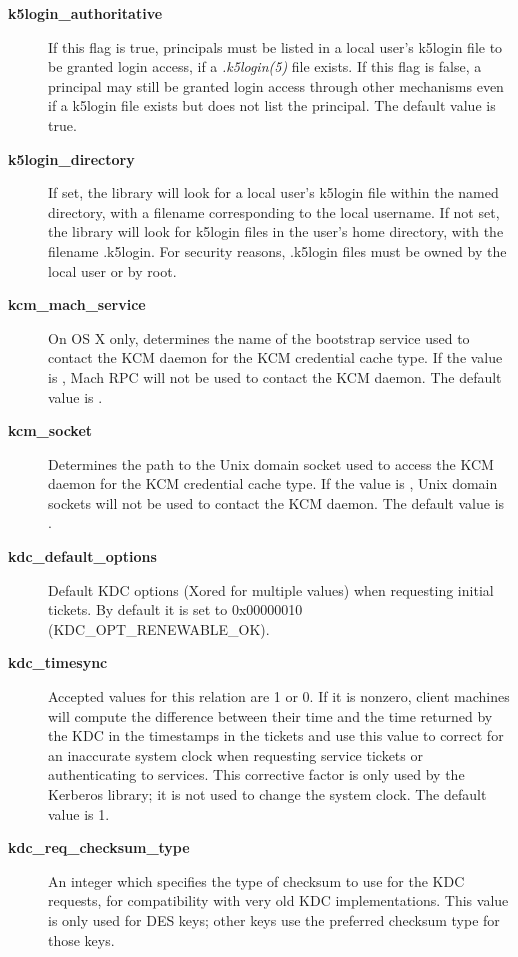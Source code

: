 \documentclass[letterpaper,10pt,english]{sphinxmanual}
\begin{document}
\begin{description}
\item[{\textbf{k5login\_authoritative}}] \leavevmode
If this flag is true, principals must be listed in a local user's
k5login file to be granted login access, if a \emph{.k5login(5)}
file exists.  If this flag is false, a principal may still be
granted login access through other mechanisms even if a k5login
file exists but does not list the principal.  The default value is
true.

\item[{\textbf{k5login\_directory}}] \leavevmode
If set, the library will look for a local user's k5login file
within the named directory, with a filename corresponding to the
local username.  If not set, the library will look for k5login
files in the user's home directory, with the filename .k5login.
For security reasons, .k5login files must be owned by
the local user or by root.

\item[{\textbf{kcm\_mach\_service}}] \leavevmode
On OS X only, determines the name of the bootstrap service used to
contact the KCM daemon for the KCM credential cache type.  If the
value is \code{-}, Mach RPC will not be used to contact the KCM
daemon.  The default value is .

\item[{\textbf{kcm\_socket}}] \leavevmode
Determines the path to the Unix domain socket used to access the
KCM daemon for the KCM credential cache type.  If the value is
\code{-}, Unix domain sockets will not be used to contact the KCM
daemon.  The default value is
.

\item[{\textbf{kdc\_default\_options}}] \leavevmode
Default KDC options (Xored for multiple values) when requesting
initial tickets.  By default it is set to 0x00000010
(KDC\_OPT\_RENEWABLE\_OK).

\item[{\textbf{kdc\_timesync}}] \leavevmode
Accepted values for this relation are 1 or 0.  If it is nonzero,
client machines will compute the difference between their time and
the time returned by the KDC in the timestamps in the tickets and
use this value to correct for an inaccurate system clock when
requesting service tickets or authenticating to services.  This
corrective factor is only used by the Kerberos library; it is not
used to change the system clock.  The default value is 1.

\item[{\textbf{kdc\_req\_checksum\_type}}] \leavevmode
An integer which specifies the type of checksum to use for the KDC
requests, for compatibility with very old KDC implementations.
This value is only used for DES keys; other keys use the preferred
checksum type for those keys.


\end{description}
\end{document}

